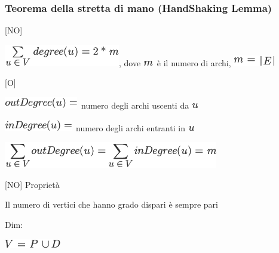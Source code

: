 \documentclass{article}
\begin{document}
\hypertarget{h.d1yeo9bkhutt}{\subsubsection{\texorpdfstring{{Teorema
della stretta di mano (HandShaking
Lemma)}}{Teorema della stretta di mano (HandShaking Lemma)}}\label{h.d1yeo9bkhutt}}

{{[}NO{]}}

\includegraphics{images/image361.png}{, dove
}\includegraphics{images/image235.png}{~è il numero di archi,
}\includegraphics{images/image362.png}

{{[}O{]}}

\includegraphics{images/image363.png}{~numero degli archi
uscenti da }\includegraphics{images/image103.png}

\includegraphics{images/image364.png}{~numero degli archi entranti in
}\includegraphics{images/image103.png}



\includegraphics{images/image365.png}

{}

{{[}NO{]} Proprietà}

{Il numero di vertici che hanno grado dispari è sempre pari}

{Dim: }

\includegraphics{images/image366.png}
\end{document}
